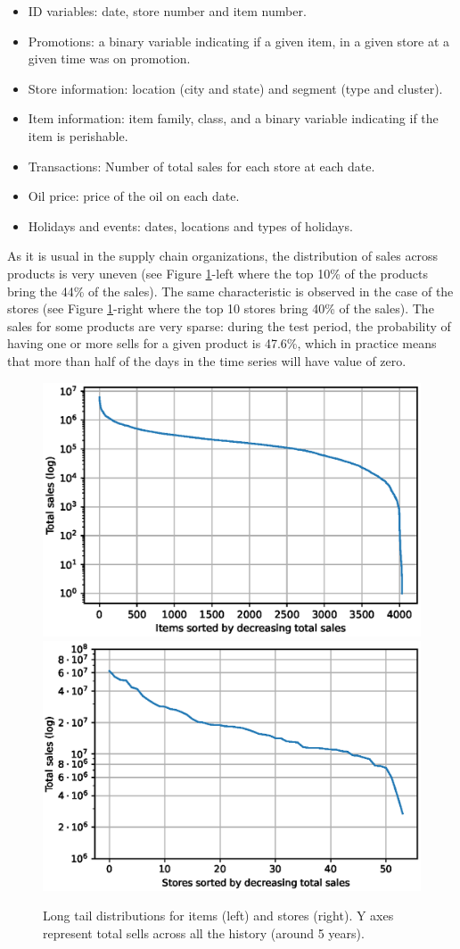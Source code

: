 \documentclass{elsarticle}
\begin{document}
	\begin{itemize}
		\item ID variables: date, store number and item number.
		\item Promotions: a binary variable indicating if a given item, in a given store at a given time was on promotion.
		\item Store information: location (city and state) and segment (type and cluster).
		\item Item information: item family, class, and a binary variable indicating if the item is perishable.
		\item Transactions: Number of total sales for each store at each date.
		\item Oil price: price of the oil on each date.
		\item Holidays and events: dates, locations and types of holidays.
	\end{itemize}
	
	As it is usual in the supply chain organizations, the distribution of sales across products is very uneven (see Figure \ref{fig:tails}-left where the top 10\% of the products bring the 44\% of the sales). The same characteristic is observed in the case of the stores (see Figure \ref{fig:tails}-right where the top 10 stores bring 40\% of the sales). The sales for some products are very sparse: during the test period, the probability of having one or more sells for a given product is 47.6\%, which in practice means that more than half of the days in the time series will have value of zero.
	
	\begin{figure}
		\centering
		\includegraphics[width=0.48\linewidth]{img/items_tail_log}
		\includegraphics[width=0.48\linewidth]{img/stores_tail_log}
		\caption{Long tail distributions for items (left) and stores (right). Y axes represent total sells across all the history (around 5 years).}
		\label{fig:tails}
	\end{figure}
	
\end{document}
